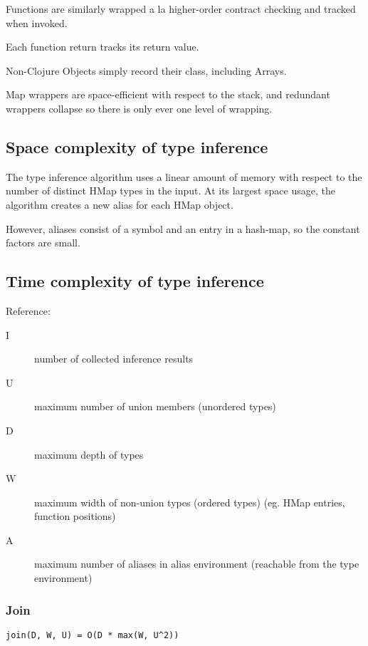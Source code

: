 Functions are similarly wrapped a la higher-order contract checking and tracked when invoked.

Each function return tracks its return value.

Non-Clojure Objects simply record their class, including Arrays.

Map wrappers are space-efficient with respect to the stack, and
redundant wrappers collapse so there is only ever one level of
wrapping.

\pagebreak

\subsection{Space complexity of type inference}

The type inference algorithm uses a linear amount of memory with respect
to the number of distinct HMap types in the input.
At its largest space usage, the algorithm creates a new alias for each HMap object.

However, aliases consist of a symbol and an entry in a hash-map, so the constant
factors are small.

\subsection{Time complexity of type inference}

Reference:

\begin{description}
  \item [I] number of collected inference results
  \item [U] maximum number of union members (unordered types)
  \item [D] maximum depth of types
  \item [W] maximum width of non-union types (ordered types) (eg. HMap entries, function positions)
  \item [A] maximum number of aliases in alias environment (reachable from the type environment)
\end{description}

\subsubsection{Join}

\begin{verbatim}
join(D, W, U) = O(D * max(W, U^2))
\end{verbatim}

